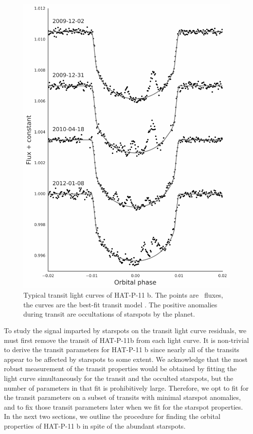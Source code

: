\begin{figure}
\centering
\includegraphics[scale=0.4]{stsp_hat_p_11/transit_gallery.pdf}
\caption{Typical transit light curves of HAT-P-11 b. The points are \kepler\ fluxes, the curves are the best-fit transit model \citep{Mandel2002}. The positive anomalies during transit are occultations of starspots by the planet.}
\label{fig:transit_gallery}
\end{figure}

To study the signal imparted by starspots on the transit light curve residuals, we must first remove the transit of HAT-P-11b from each light curve. It is non-trivial to derive the transit parameters for HAT-P-11 b since nearly all of the transits appear to be affected by starspots to some extent. We acknowledge that the most robust measurement of the transit properties would be obtained by fitting the light curve simultaneously for the transit and the occulted starspots, but the number of parameters in that fit is prohibitively large. Therefore, we opt to fit for the transit parameters on a subset of transits with minimal starspot anomalies, and to fix those transit parameters later when we fit for the starspot properties. In the next two sections, we outline the procedure for finding the orbital properties of HAT-P-11 b in spite of the abundant starspots.

